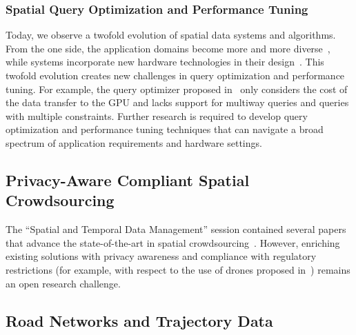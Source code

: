 \documentclass[11pt,dvipdfm]{article}
\begin{document}
\subsubsection{Spatial Query Optimization and Performance Tuning}

Today, we observe a twofold evolution of spatial data systems and algorithms.
From the one side, the application domains become more and more diverse~\cite{conf/icde/CVS2022, conf/icde/ZLSYS2022, conf/icde/ZGHCL2022, conf/icde/ZWGMHZJ2022}, while systems incorporate new hardware technologies in their design~\cite{conf/icde/DF2022}.
This twofold evolution creates new challenges in query optimization and performance tuning.
For example, the query optimizer proposed in~\cite{conf/icde/DF2022} only considers the cost of the data transfer to the GPU and lacks support for multiway queries and queries with multiple constraints. 
Further research is required to develop query optimization and performance tuning techniques that can navigate a broad spectrum of application requirements and hardware settings.

\subsection{Privacy-Aware Compliant Spatial Crowdsourcing}

The ``Spatial and Temporal Data Management'' session contained several papers that advance the state-of-the-art in spatial crowdsourcing~\cite{conf/icde/CZZYS2022, conf/icde/WLPYHWT2022, conf/icde/ZLLGL2022}.
However, enriching existing solutions with privacy awareness and compliance with regulatory restrictions (for example, with respect to the use of drones proposed in~\cite{ conf/icde/WLPYHWT2022}) remains an open research challenge. 

\subsection{Road Networks and Trajectory Data}
\end{document}
